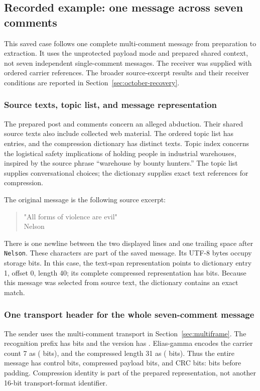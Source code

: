 \subsection{Recorded example: one message across seven comments}
\label{sec:multicomment-example}

This saved case follows one complete multi-comment message from preparation to extraction. It uses the unprotected payload mode and prepared shared context, not seven independent single-comment messages. The receiver was supplied with ordered carrier references. The broader source-excerpt results and their receiver conditions are reported in Section~\ref{sec:october-recovery}.

\subsubsection{Source texts, topic list, and message representation}
The prepared post and comments concern an alleged abduction. Their shared source texts also include collected web material. The ordered topic list has \McTopicChoices{} entries, and the compression dictionary has \McDictionaryEntries{} distinct texts. Topic index \McTopicIndex{} concerns the logistical safety implications of holding people in industrial warehouses, inspired by the source phrase ``warehouse by bounty hunters.'' The topic list supplies conversational choices; the dictionary supplies exact text references for compression.

The original message is the following source excerpt:
\begin{quote}
\ttfamily
"All forms of violence are evil"\\
Nelson
\end{quote}
There is one newline between the two displayed lines and one trailing space after \texttt{Nelson}. These characters are part of the saved message. Its \McPayloadBytes{} UTF-8 bytes occupy \McPayloadStorageBits{} storage bits. In this case, the text-span representation points to dictionary entry 1, offset 0, length 40; its complete compressed representation has \McCompressedBits{} bits. Because this message was selected from source text, the dictionary contains an exact match.

\subsubsection{One transport header for the whole seven-comment message}
The sender uses the multi-comment transport in Section~\ref{sec:multiframe}. The recognition prefix has \McMarkerBits{} bits and the version has \McVersionBits{}. Elias-gamma encodes the carrier count 7 as \texttt{\McGammaCount} (\McCountBits{} bits), and the compressed length 31 as \texttt{\McGammaLength} (\McLengthBits{} bits). Thus the entire message has \McControlBits{} control bits, \McCompressedBits{} compressed payload bits, and \McIntegrityBits{} CRC bits: \McStreamBits{} bits before padding. Compression identity is part of the prepared representation, not another 16-bit transport-format identifier.

